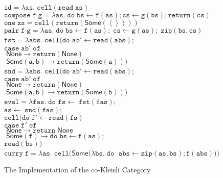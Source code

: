 \documentclass[nocopyrightspace,preprint]{sigplanconf}
\newcommand{\term}[1]{\ensuremath{\mathtt{{#1}}}}
\newcommand{\unitval}{\left<\right>}
\newcommand{\None}{\mathsf{None}}
\newcommand{\Some}[1]{\mathsf{Some}({#1})}
\begin{document}
\begin{figure}
{\small
\begin{tabbing}
\term{id = \lambda xs.\;cell(read\;xs)} 
\\[0.5em]

\term{compose\;f\;g =\lambda as.\; do\;
bs \leftarrow f(as);
cs \leftarrow g(bs);
return(cs)} 
\\[0.5em]

\term{one\;xs = cell(return(\Some{\unitval}))}
\\[0.5em]

\term{pair\;f\;g = \lambda as.\;do\;
bs \leftarrow f(as); 
\;cs \leftarrow g(as);
\;zip(bs,cs)}
\\[0.5em]

\term{fst = \lambda abs.\;cell(do}
  \= \term{ab' \leftarrow read(abs);} \\
  \>\term{case \; ab'\; of} \\
  \>\term{\;\None \to return(\None)} \\
  \>\term{\;\Some{a,b} \to return(\Some{a}))} 
\\[0.5em]


\term{snd = \lambda abs.\;cell(do}
  \= \term{ab' \leftarrow read(abs);} \\
  \>\term{case \; ab'\; of} \\
  \>\term{\;\None \to return(\None)} \\
  \>\term{\;\Some{a,b} \to return(\Some{b}))} 
\\[0.5em]

\term{eval = \lambda fas.\;do}\;
              \=\term{fs \leftarrow \;fst(fas);}\\
              \>\term{as \leftarrow \;snd(fas);}\\
              \>\term{cell(do\;}\=\term{f' \leftarrow read(fs)}\\
              \>                  \>\term{case\;f'\;of}\\
              \>                  \>\term{\;\None \to return\;\None} \\
              \>                  \>\term{\;\Some{f} \to do\;}\=\term{bs \leftarrow f(as);} \\
              \>                  \>                            \>$\term{read(bs)})$ 
\\[0.5em]

\term{curry\;f =\lambda as.\;cell(\mathsf{Some}(\lambda bs.\;do\;}
  \=\term{abs \leftarrow zip(as,bs); f(abs)))}
\end{tabbing}
}
\caption{The Implementation of the co-Kleisli Category}
\label{cokleisli-implementation}
\end{figure}
\end{document}
